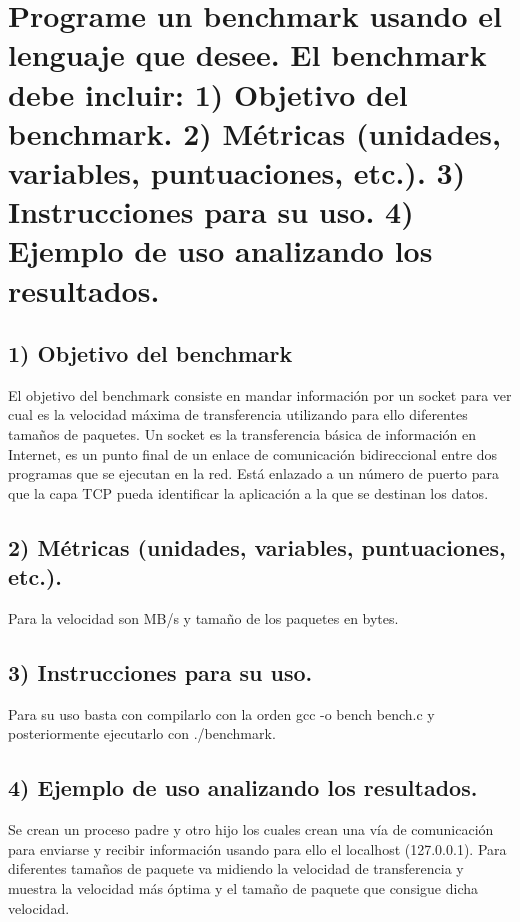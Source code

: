 	\section{Programe un benchmark usando el lenguaje que desee. El benchmark debe incluir:
		1) Objetivo del benchmark.
		2) Métricas (unidades, variables, puntuaciones, etc.).
		3) Instrucciones para su uso.
		4) Ejemplo de uso analizando los resultados.}
	
	\subsection{1) Objetivo del benchmark}
	
	El objetivo del benchmark consiste en mandar información por un socket para ver cual es la velocidad máxima de transferencia utilizando para ello diferentes tamaños de paquetes. Un socket es la transferencia básica de información en Internet, es un punto final de un enlace de comunicación bidireccional entre dos programas que se ejecutan en la red. Está enlazado a un número de puerto para que la capa TCP pueda identificar la aplicación a la que se destinan los datos\cite{ejercicio5-1,ejercicio5-2,ejercicio5-3,ejercicio5-4,ejercicio5-5,ejercicio5-6,ejercicio5-7,ejercicio5-8,ejercicio5-9,ejercicio5-10,ejercicio5-11,ejercicio5-12,ejercicio5-13}.
	
	\subsection{2) Métricas (unidades, variables, puntuaciones, etc.).}
	
	Para la velocidad son MB/s y tamaño de los paquetes en bytes.
	
	\subsection{3) Instrucciones para su uso.}
	
	Para su uso basta con compilarlo con la orden gcc -o bench bench.c y posteriormente ejecutarlo con ./benchmark.
	
	\subsection{4) Ejemplo de uso analizando los resultados.}
	
	
	Se crean un proceso padre y otro hijo los cuales crean una vía de comunicación para enviarse y recibir información usando para ello el localhost (127.0.0.1). Para diferentes tamaños de paquete va midiendo la velocidad de transferencia y muestra la velocidad más óptima y el tamaño de paquete que consigue dicha velocidad.\\
	
